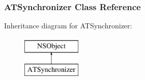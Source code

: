 \hypertarget{interface_a_t_synchronizer}{
\subsubsection{ATSynchronizer Class Reference}
\label{interface_a_t_synchronizer}
}
Inheritance diagram for ATSynchronizer:\begin{figure}[h]
\begin{center}
\leavevmode
\includegraphics[height=2.000000cm]{interface_a_t_synchronizer}
\end{center}
\end{figure}
